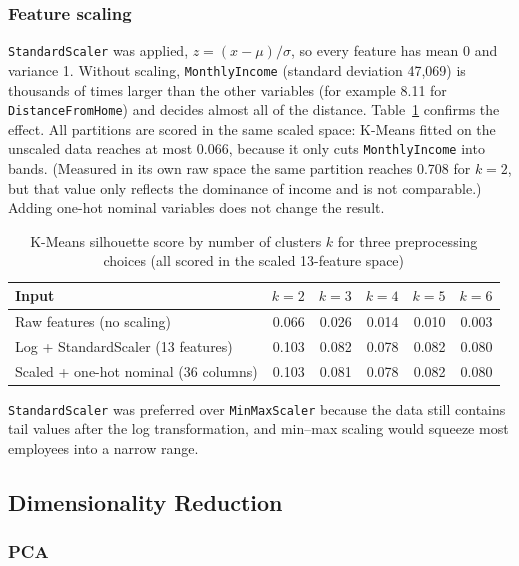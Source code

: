 \documentclass[12pt,a4paper]{article}
\begin{document}
\subsubsection{Feature scaling}

\texttt{StandardScaler} was applied, $z = (x - \mu)/\sigma$, so every feature has
mean 0 and variance 1. Without scaling, \texttt{MonthlyIncome}
(standard deviation 47,069) is thousands of times larger than the other
variables (for example 8.11 for \texttt{DistanceFromHome}) and decides almost
all of the distance. Table~\ref{tab:silhouette} confirms the effect. All
partitions are scored in the same scaled space: K-Means fitted on the unscaled
data reaches at most 0.066, because it only cuts \texttt{MonthlyIncome} into
bands. (Measured in its own raw space the same partition reaches 0.708 for
$k=2$, but that value only reflects the dominance of income and is not
comparable.) Adding one-hot nominal variables does not change the result.

\begin{table}[H]
\centering
\caption{K-Means silhouette score by number of clusters $k$ for three
preprocessing choices (all scored in the scaled 13-feature space)}
\label{tab:silhouette}
\small
\begin{tabular}{lrrrrr}
\toprule
\textbf{Input} & $k=2$ & $k=3$ & $k=4$ & $k=5$ & $k=6$\\
\midrule
Raw features (no scaling)       & 0.066 & 0.026 & 0.014 & 0.010 & 0.003\\
Log + StandardScaler (13 features) & 0.103 & 0.082 & 0.078 & 0.082 & 0.080\\
Scaled + one-hot nominal (36 columns) & 0.103 & 0.081 & 0.078 & 0.082 & 0.080\\
\bottomrule
\end{tabular}
\end{table}

\texttt{StandardScaler} was preferred over \texttt{MinMaxScaler} because the data
still contains tail values after the log transformation, and min--max scaling
would squeeze most employees into a narrow range.

\subsection{Dimensionality Reduction}

\subsubsection{PCA}
\end{document}
